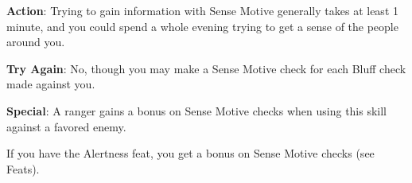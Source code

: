 \textbf{Action}: Trying to gain information with Sense Motive generally takes at least 1 minute, and you could spend a whole evening trying to get a sense of the people around you.
				
\textbf{Try Again}: No, though you may make a Sense Motive check for each Bluff check made against you.
				
\textbf{Special}: A ranger gains a bonus on Sense Motive checks when using this skill against a favored enemy.
				
If you have the Alertness feat, you get a bonus on Sense Motive checks (see Feats).
        	